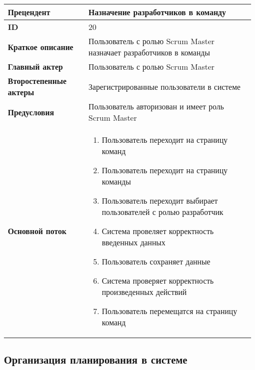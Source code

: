 \documentclass[14pt,a4paper]{extarticle}
\begin{document}
\begin{tabular}{|l|p{9cm}|}
	\hline
	\textbf{Прецендент}            & Назначение разработчиков в команду                                     \\
	\hline
	\textbf{ID}                    & 20                                                                     \\
	\hline
	\textbf{Краткое описание}      & Пользователь с ролью Scrum Master назначает разработчиков в команды    \\
	\hline
	\textbf{Главный актер}         & Пользователь с ролью Scrum Master                                      \\
	\hline
	\textbf{Второстепенные актеры} & Зарегистрированные пользователи в системе                              \\
	\hline
	\textbf{Предусловия}           & Пользователь авторизован и имеет роль Scrum Master                     \\
	\hline
	\textbf{Основной поток}        & \begin{enumerate}
		                                 \item Пользователь переходит на страницу команд
		                                 \item Пользователь переходит на страницу команды
		                                 \item Пользователь переходит выбирает пользователей с ролью разработчик
		                                 \item Система провеляет корректность введенных данных
		                                 \item Пользователь сохраняет данные
		                                 \item Система проверяет корректность произведенных действий
		                                 \item Пользователь перемещатся на страницу команд
	                                 \end{enumerate} \\
	\hline
\end{tabular}

\subsection{Организация планирования в системе}
\end{document}
